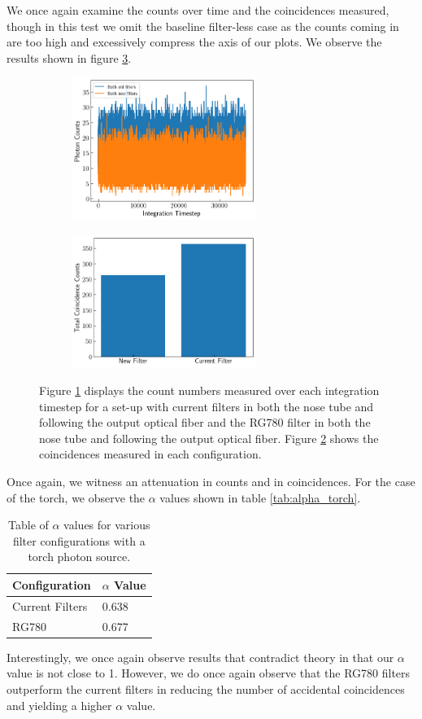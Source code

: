 \documentclass[letterpaper, 11 pt]{article}
\begin{document}
We once again examine the counts over time and the coincidences measured, though in this test
we omit the baseline filter-less case as the counts coming in are too high and excessively compress
the axis of our plots. We observe the results shown in figure \ref{fig:torch_filters}.
\begin{figure}[H]%
    \centering
    \begin{subfigure}{.4\textwidth}
    \includegraphics[width=6cm]{filter_ch1_torch.png}
    \caption{ }
    \label{fig:tch1}
    \end{subfigure}
    \begin{subfigure}{.4\textwidth}
    \includegraphics[width = 6cm]{filter_cc_torc.png}
    \caption{ }
    \label{fig:tcc}
    \end{subfigure}
    \caption{Figure \ref{fig:tch1} displays the count numbers measured over each
    integration timestep for a set-up with current filters in both the
    nose tube and following the output optical fiber and the RG780 filter in
    both the nose tube and following the output optical fiber. Figure
    \ref{fig:tcc} shows the coincidences measured in each configuration.}
    \label{fig:torch_filters}
\end{figure}
Once again, we witness an attenuation in counts and in coincidences. For the case of the
torch, we observe the $\alpha$ values shown in table \ref{tab:alpha_torch}.
\begin{table}[H]
    \centering
    \begin{tabular}{|l|l|}
    \hline
    \textbf{Configuration} & \textbf{$\alpha$ Value} \\ \hline
    Current Filters        & 0.638                   \\ \hline
    RG780                  & 0.677                   \\ \hline
    \end{tabular}
    \caption{Table of $\alpha$ values for various filter configurations with a torch photon source.}
\end{table}\label{tab:alpha_torch}
Interestingly, we once again observe results that contradict theory in that our $\alpha$ value
is not close to 1. However, we do once again observe that the RG780 filters outperform the current filters
in reducing the number of accidental coincidences and yielding a higher $\alpha$ value.
\end{document}
